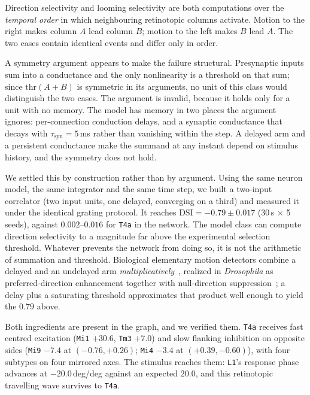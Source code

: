 \documentclass[10pt,twoside]{article}
\newcommand{\cell}[1]{\texttt{#1}}
\begin{document}
Direction selectivity and looming selectivity are both computations over the
\emph{temporal order} in which neighbouring retinotopic columns activate.
Motion to the right makes column $A$ lead column $B$; motion to the left makes
$B$ lead $A$. The two cases contain identical events and differ only in order.

A symmetry argument appears to make the failure structural. Presynaptic inputs
sum into a conductance and the only nonlinearity is a threshold on that sum;
since $\mathrm{thr}(A+B)$ is symmetric in its arguments, no unit of this class
would distinguish the two cases. The argument is invalid, because it holds only
for a unit with no memory. The model has memory in two places the argument
ignores: per-connection conduction delays, and a synaptic conductance that
decays with $\tau_{\mathrm{syn}}=5$\,ms rather than vanishing within the step.
A delayed arm and a persistent conductance make the summand at any instant
depend on stimulus history, and the symmetry does not hold.

We settled this by construction rather than by argument. Using the same neuron
model, the same integrator and the same time step, we built a two-input
correlator (two input units, one delayed, converging on a third) and
measured it under the identical grating protocol. It reaches
$\mathrm{DSI}=-0.79\pm0.017$ (30\,s $\times$ 5 seeds), against
$0.002$--$0.016$ for \cell{T4a} in the network. The model class can compute
direction selectivity to a magnitude far above the experimental selection
threshold. Whatever prevents the network from doing so, it is not the
arithmetic of summation and threshold. Biological elementary motion detectors
combine a delayed and an undelayed arm
\emph{multiplicatively}~\citep{hassenstein1956,borst2010}, realized in
\emph{Drosophila} as preferred-direction enhancement together with
null-direction suppression~\citep{haag2016,gruntman2018}; a delay plus a
saturating threshold approximates that product well enough to yield the
$0.79$ above.

Both ingredients are present in the graph, and we verified them. \cell{T4a}
receives fast centred excitation (\cell{Mi1} $+30.6$, \cell{Tm3} $+7.0$) and
slow flanking inhibition on opposite sides (\cell{Mi9} $-7.4$ at
$(-0.76,+0.26)$; \cell{Mi4} $-3.4$ at $(+0.39,-0.60)$), with four subtypes on
four mirrored axes. The stimulus reaches them: \cell{L1}'s response phase
advances at $-20.0$\,deg/deg against an expected $20.0$, and this retinotopic
travelling wave survives to \cell{T4a}.
\end{document}
